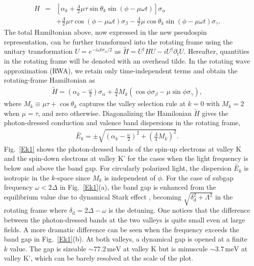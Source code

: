 \documentclass[reprint,amsmath,amssymb,aps,prb]{revtex4-1}
\begin{document}
%
\begin{eqnarray}
H &=& \left[\alpha_k +\frac{\Lambda}{2}\mu\tau\sin\theta_k\sin(\phi-\mu\omega t)\right]\sigma_\alpha \label{totalHam} \\
&&+\frac{\Lambda}{2}\mu\tau\cos(\phi-\mu\omega t)\sigma_\beta -\frac{\Lambda}{2}\mu\cos\theta_k\sin(\phi-\mu\omega t)\sigma_\gamma.  \nonumber
\end{eqnarray}
%
The total Hamiltonian above, now expressed in the new pseudospin representation, can be further transformed into the rotating frame using the unitary transformation $U=e^{-i\omega t\sigma_\alpha/2}$ as  $\tilde{H} = U^{\dagger}HU - i U^{\dagger}{\partial_t U}$. Hereafter, quantities in the rotating frame will be denoted with an overhead tilde.  In the rotating wave approximation (RWA), we retain only time-independent terms and obtain the rotating-frame Hamiltonian as 
%
\begin{eqnarray}
\tilde{H}  
= \left(\alpha_k-\frac{\omega}{2}\right)\sigma_\alpha +\frac{\Lambda}{4}M_k\left(\cos\phi \sigma_\beta-\mu\sin\phi\sigma_\gamma\right),  \label{ham'}
\end{eqnarray}
%
where $M_k \equiv \mu\tau+\cos\theta_k$ captures the valley selection rule at $k = 0$ with $M_k = 2$ when $\mu = \tau$, and zero otherwise. Diagonalizing the Hamilonian $\tilde{H}$ gives the photon-dressed conduction and valence band dispersions in the rotating frame,
%
\begin{eqnarray} \label{eq:banddisper}
\tilde{E_k}=\pm \sqrt{\left(\alpha_k-\frac{\omega}{2}\right)^2+\left(\frac{\Lambda}{4}M_k\right)^2}. 
\end{eqnarray}
%
Fig.~\ref{Ek1} shows the photon-dressed bands of the  spin-up electrons at valley K and the spin-down electrons at valley K' for the cases when the light frequency is below and above the band gap. For circularly polarized light, the dispersion $\tilde{E_k}$ is isotropic in the $k$-space since $M_k$ is independent of $\phi$.
For the case of subgap frequency $\omega <2\Delta$ in Fig.~\ref{Ek1}(a), the band gap is enhanced from the equilibrium value due to dynamical Stark effect \cite{haug2009quantum}, becoming $\sqrt{\delta_{\mathrm{d}}^2+{\Lambda}^2}$ in the  rotating frame where $\delta_{\mathrm{d}} =  2\Delta-{\omega}$ is the detuning. One notices that the difference between the photon-dressed bands at the two valleys is quite small even at large fields. A more dramatic difference can be seen when the frequency exceeds the band gap in Fig.~\ref{Ek1}(b). At both valleys, a dynamical gap is opened at a  finite $k$ value. The gap is sizeable $\sim 77.2\,\mathrm{meV}$ at valley K but is minuscule $\sim 3.7\,\mathrm{meV}$ at valley K', which can be barely resolved at the scale of the plot. 
\end{document}
